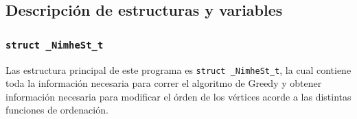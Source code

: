 \documentclass[11pt,a4paper]{article}
\theoremstyle{plain}
\begin{document}
	\subsection{Descripción de estructuras y variables}
	\label{sec:3.1}
	
		\subsubsection{\texttt{struct \_NimheSt\_t}}
	
Las estructura principal de este programa es \texttt{struct \_NimheSt\_t}, la cual contiene toda la información necesaria para correr el algoritmo de Greedy y obtener información necesaria para modificar el órden de los vértices acorde a las distintas funciones de ordenación.\\
\end{document}
